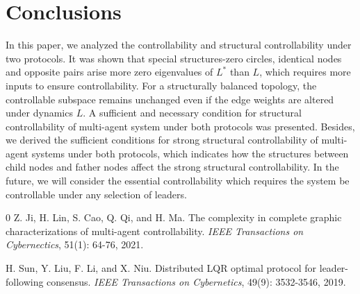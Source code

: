 \documentclass[a4paper,11pt]{article}
\begin{document}
{\section{Conclusions}
In this paper, we analyzed the controllability and structural controllability under two protocols. It was shown that special  structures-zero circles, identical nodes and opposite pairs arise more zero eigenvalues of $L^*$ than $L$, which requires more inputs to ensure controllability. For a structurally balanced topology, the controllable subspace remains unchanged even if the edge weights are altered under dynamics $L$. A sufficient and necessary condition for structural controllability of multi-agent system under both protocols was presented. Besides, we derived the sufficient conditions for strong structural controllability of multi-agent systems under both protocols, which indicates how the structures between child nodes and father nodes affect the strong structural controllability. In the future, we will consider the essential controllability which requires the system be controllable under any selection of leaders.%

%
\begin{thebibliography}{0}
Z. Ji, H. Lin, S. Cao, Q. Qi, and H. Ma. The complexity in complete graphic characterizations of multi-agent controllability. \emph{IEEE Transactions on Cybernectics}, 51(1): 64-76, 2021.

{H. Sun, Y. Liu, F. Li, and X. Niu. Distributed LQR optimal protocol for leader-following consensus. \emph{IEEE Transactions on Cybernetics}, 49(9): 3532-3546, 2019.}


\end{thebibliography}}
\end{document}
